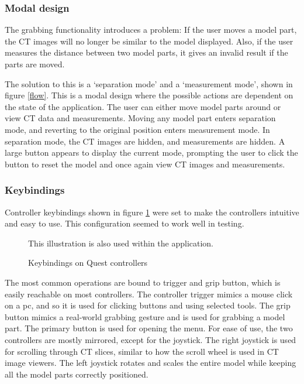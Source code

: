\documentclass[a4paper]{report}
\begin{document}
\subsubsection{Modal design}
The grabbing functionality introduces a problem: If the user moves a model part, the CT images will no longer be similar to the model displayed. Also, if the user measures the distance between two model parts, it gives an invalid result if the parts are moved.

The solution to this is a `separation mode' and a `measurement mode', shown in figure \ref{flow}. This is a modal design where the possible actions are dependent on the state of the application. The user can either move model parts around or view CT data and measurements. Moving any model part enters separation mode, and reverting to the original position enters measurement mode. In separation mode, the CT images are hidden, and measurements are hidden. A large button appears to display the current mode, prompting the user to click the button to reset the model and once again view CT images and measurements.

\subsubsection{Keybindings}
Controller keybindings shown in figure \ref{controllers} were set to make the controllers intuitive and easy to use. This configuration seemed to work well in testing.

\begin{figure}[h!]
    \centering
	\hfill
	\caption{Keybindings on Quest controllers}\label{controllers}
  \small
  This illustration is also used within the application.
\end{figure}

The most common operations are bound to trigger and grip button, which is easily reachable on most controllers. The controller trigger mimics a mouse click on a pc, and so it is used for clicking buttons and using selected tools. The grip button mimics a real-world grabbing gesture and is used for grabbing a model part.
The primary button is used for opening the menu.
For ease of use, the two controllers are mostly mirrored, except for the joystick. The right joystick is used for scrolling through CT slices, similar to how the scroll wheel is used in CT image viewers. The left joystick rotates and scales the entire model while keeping all the model parts correctly positioned.
\end{document}
